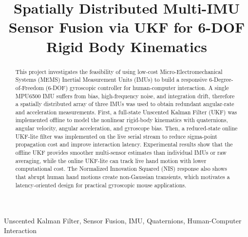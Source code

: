 \documentclass[conference]{IEEEtran}
\begin{document}
\title{Spatially Distributed Multi-IMU Sensor Fusion via UKF for 6-DOF Rigid Body Kinematics}

\author{
\and
{}
}

\maketitle

\begin{abstract}
This project investigates the feasibility of using low-cost Micro-Electromechanical Systems (MEMS) Inertial Measurement Units (IMUs) to build a responsive 6-Degree-of-Freedom (6-DOF) gyroscopic controller for human-computer interaction. A single MPU6500 IMU suffers from bias, high-frequency noise, and integration drift, therefore a spatially distributed array of three IMUs was used to obtain redundant angular-rate and acceleration measurements. First, a full-state Unscented Kalman Filter (UKF) was implemented offline to model the nonlinear rigid-body kinematics with quaternions, angular velocity, angular acceleration, and gyroscope bias. Then, a reduced-state online UKF-lite filter was implemented on the live serial stream to reduce sigma-point propagation cost and improve interaction latency. Experimental results show that the offline UKF provides smoother multi-sensor estimates than individual IMUs or raw averaging, while the online UKF-lite can track live hand motion with lower computational cost. The Normalized Innovation Squared (NIS) response also shows that abrupt human hand motions create non-Gaussian transients, which motivates a latency-oriented design for practical gyroscopic mouse applications.
\end{abstract}

\begin{IEEEkeywords}
Unscented Kalman Filter, Sensor Fusion, IMU, Quaternions, Human-Computer Interaction
\end{IEEEkeywords}
\end{document}
